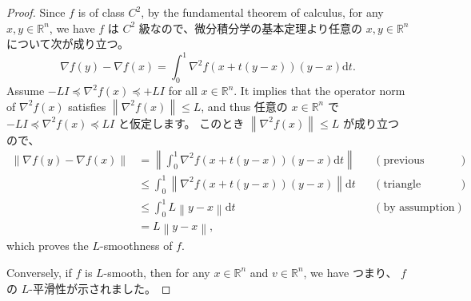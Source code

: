 \documentclass[0_main]{subfiles}
\begin{document}
\begin{proof}
    \ifEn
        Since $f$ is of class $C^2$, by the fundamental theorem of calculus, for any $x,y \in \mathbb{R}^n$, we have
    \else
        $f$ は $C^2$ 級なので、微分積分学の基本定理より任意の $x,y \in \mathbb{R}^n$ について次が成り立つ。
    \fi
    \begin{equation*}
        \nabla f(y) - \nabla f(x)
        = \int_0^1 \nabla^2 f(x+t(y-x))(y-x) \mathrm{d}t.
    \end{equation*}
    \ifEn
        Assume $-L I \preceq \nabla^2 f(x) \preceq +L I$ for all $x \in \mathbb{R}^n$.
        It implies that the operator norm of $\nabla^2 f(x)$ satisfies $\left\lVert \nabla^2 f(x) \right\rVert \le L$, and thus
    \else
        任意の $x \in \mathbb{R}^n$ で $-L I \preceq \nabla^2 f(x) \preceq L I$ と仮定します。
        このとき $\left\lVert \nabla^2 f(x) \right\rVert \le L$ が成り立つので、
    \fi
    \begin{align*}
        \left\lVert \nabla f(y) - \nabla f(x) \right\rVert
         & = \left\lVert \int_0^1 \nabla^2 f(x+t(y-x))(y-x) \mathrm{d}t \right\rVert   &  & (\text{previous equation})   \\
         & \le \int_0^1 \left\lVert \nabla^2 f(x+t(y-x))(y-x) \right\rVert \mathrm{d}t &  & (\text{triangle inequality}) \\
         & \le \int_0^1 L\left\lVert y-x \right\rVert \mathrm{d}t                      &  & (\text{by assumption})       \\
         & = L\left\lVert y-x \right\rVert,
    \end{align*}
    \ifEn
        which proves the $L$-smoothness of $f$.

        Conversely, if $f$ is $L$-smooth, then for any $x \in \mathbb{R}^n$ and $v \in \mathbb{R}^n$, we have
    \else
        つまり、 $f$ の $L$-平滑性が示されました。


\end{proof}
\end{document}
